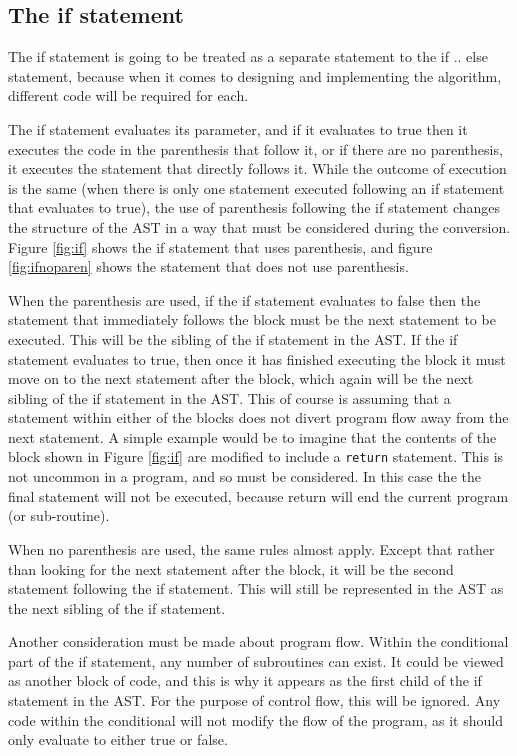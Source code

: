 \subsection{The if statement}

The if statement is going to be treated as a separate statement to the if .. else statement, because when it comes to designing and implementing the algorithm, different code will be required for each.

The if statement evaluates its parameter, and if it evaluates to true then it executes the code in the parenthesis that follow it, or if there are no parenthesis, it executes the statement that directly follows it. While the outcome of execution is the same (when there is only one statement executed following an if statement that evaluates to true), the use of parenthesis following the if statement changes the structure of the AST in a way that must be considered during the conversion. Figure \ref{fig:if} shows the if statement that uses parenthesis, and figure \ref{fig:ifnoparen} shows the statement that does not use parenthesis.

When the parenthesis are used, if the if statement evaluates to false then the statement that immediately follows the block must be the next statement to be executed. This will be the sibling of the if statement in the AST. If the if statement evaluates to true, then once it has finished executing the block it must move on to the next statement after the block, which again will be the next sibling of the if statement in the AST. This of course is assuming that a statement within either of the blocks does not divert program flow away from the next statement. A simple example would be to imagine that the contents of the block shown in Figure \ref{fig:if} are modified to include a \verb|return| statement. This is not uncommon in a program, and so must be considered. In this case the the final statement will not be executed, because return will end the current program (or sub-routine).

When no parenthesis are used, the same rules almost apply. Except that rather than looking for the next statement after the block, it will be the second statement following the if statement. This will still be represented in the AST as the next sibling of the if statement.

Another consideration must be made about program flow. Within the conditional part of the if statement, any number of subroutines can exist. It could be viewed as another block of code, and this is why it appears as the first child of the if statement in the AST. For the purpose of control flow, this will be ignored. Any code within the conditional will not modify the flow of the program, as it should only evaluate to either true or false.

